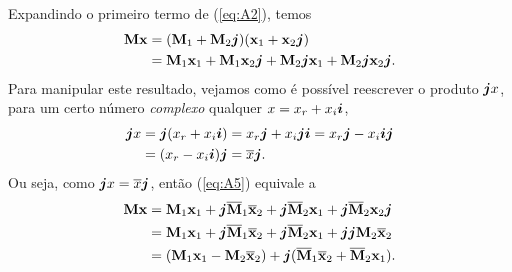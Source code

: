 \documentclass[
	11pt,				%
	openright,			%
	twoside,			%
	a4paper,			%
	french,				%
	brazil,			%
	english				%
	]{abntex2}
\begin{document}
\begin{apendicesenv}
Expandindo o primeiro termo de (\ref{eq:A2}), temos
\begin{equation}
\begin{aligned}
\label{eq:A5}
\mathbf{M} \mathbf{x} &= (\mathbf{M}_1 + \mathbf{M}_2 \boldsymbol{j})(\mathbf{x}_1 + \mathbf{x}_2 \boldsymbol{j}) \\
&=\mathbf{M}_1 \mathbf{x}_1 + \mathbf{M}_1 \mathbf{x}_2 \boldsymbol{j} + \mathbf{M}_2 \boldsymbol{j} \mathbf{x}_1 + \mathbf{M}_2 \boldsymbol{j} \mathbf{x}_2 \boldsymbol{j}.
\end{aligned}
\end{equation}
Para manipular este resultado, vejamos como \'e poss\'ivel reescrever o produto $ \boldsymbol{j} x $, para um certo n\'umero \emph{complexo} qualquer $ x = x_r + x_i \boldsymbol{i} $,
\begin{equation}
\begin{aligned}
\boldsymbol{j} x &= \boldsymbol{j} (x_r + x_i \boldsymbol{i}) = x_r \boldsymbol{j} + x_i \boldsymbol{j} \boldsymbol{i} = x_r \boldsymbol{j} - x_i \boldsymbol{i} \boldsymbol{j} \\
&= (x_r - x_i \boldsymbol{i}) \boldsymbol{j} = \overline{x} \boldsymbol{j}.
\end{aligned}
\end{equation}
Ou seja, como $ \boldsymbol{j} x = \overline{x} \boldsymbol{j} $, ent\~ao (\ref{eq:A5}) equivale a
\begin{equation}
\begin{aligned}
\label{eq:A7}
\mathbf{M} \mathbf{x} &= \mathbf{M}_1 \mathbf{x}_1 + \boldsymbol{j} \overline{\mathbf{M}}_1 \overline{\mathbf{x}}_2 + \boldsymbol{j} \overline{\mathbf{M}}_2 \mathbf{x}_1 + \boldsymbol{j} \overline{\mathbf{M}}_2 \mathbf{x}_2 \boldsymbol{j} \\
&= \mathbf{M}_1 \mathbf{x}_1 + \boldsymbol{j} \overline{\mathbf{M}}_1 \overline{\mathbf{x}}_2 + \boldsymbol{j} \overline{\mathbf{M}}_2 \mathbf{x}_1 + \boldsymbol{j}\boldsymbol{j} \mathbf{M}_2 \overline{\mathbf{x}}_2 \\
&= (\mathbf{M}_1 \mathbf{x}_1 - \mathbf{M}_2 \overline{\mathbf{x}}_2) + \boldsymbol{j} (\overline{\mathbf{M}}_1 \overline{\mathbf{x}}_2 + \overline{\mathbf{M}}_2 \mathbf{x}_1).
\end{aligned}
\end{equation}


\end{apendicesenv}
\end{document}
